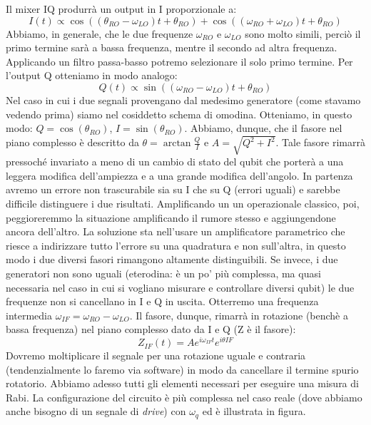 Il mixer IQ produrrà un output in I proporzionale a:
\begin{equation*}
   I(t)\propto\cos((\theta_{RO}-\omega_{LO})t+\theta_{RO})+\cos((\omega_{RO}+\omega_{LO})t+\theta_{RO})
\end{equation*}
Abbiamo, in generale, che le due frequenze $\omega_{RO}$ e $\omega_{LO}$ sono molto simili, perciò il primo termine sarà a bassa frequenza, mentre il secondo ad altra frequenza. Applicando un filtro passa-basso potremo selezionare il solo primo termine.
Per l'output Q otteniamo in modo analogo:
\begin{equation*}
    Q (t) \propto \sin \left( \left( \omega_{RO} - \omega_{LO} \right) t + \theta_{RO} \right)
\end{equation*}
Nel caso in cui i due segnali provengano dal medesimo generatore (come stavamo vedendo prima) siamo nel cosiddetto schema di omodina. Otteniamo, in questo modo: $Q=\cos(\theta_{RO})$, $I=\sin(\theta_{RO})$. Abbiamo, dunque, che il fasore nel piano complesso è descritto da $\theta = \arctan \frac{Q}{I}$ e $A = \sqrt{Q^2 + I^2}$. Tale fasore rimarrà pressoché invariato a meno di un cambio di stato del qubit che porterà a una leggera modifica dell'ampiezza e a una grande modifica dell'angolo. In partenza avremo un errore non trascurabile sia su I che su Q (errori uguali) e sarebbe difficile distinguere i due risultati. Amplificando un un operazionale classico, poi, peggioreremmo la situazione amplificando il rumore stesso e aggiungendone ancora dell'altro. La soluzione sta nell'usare un amplificatore parametrico che riesce a indirizzare tutto l'errore su una quadratura e non sull'altra, in questo modo i due diversi fasori rimangono altamente distinguibili.
Se invece, i due generatori non sono uguali (eterodina: è un po' più complessa, ma quasi necessaria nel caso in cui si vogliano misurare e controllare diversi qubit) le due frequenze non si cancellano in I e Q in uscita. Otterremo una frequenza intermedia $\omega_{IF} = \omega_{RO} - \omega_{LO}$. Il fasore, dunque, rimarrà in rotazione (benchè a bassa frequenza) nel piano complesso dato da I e Q (Z è il fasore):
\begin{equation*}
    Z_{IF}(t)=Ae^{i\omega_{IF}t}e^{i\theta{IF}}
\end{equation*}
Dovremo moltiplicare il segnale per una rotazione uguale e contraria (tendenzialmente lo faremo via software) in modo da cancellare il termine spurio rotatorio.
Abbiamo adesso tutti gli elementi necessari per eseguire una misura di Rabi. La configurazione del circuito è più complessa nel caso reale (dove abbiamo anche bisogno di un segnale di \textit{drive}) con $\omega_q$ ed è illustrata in figura.
